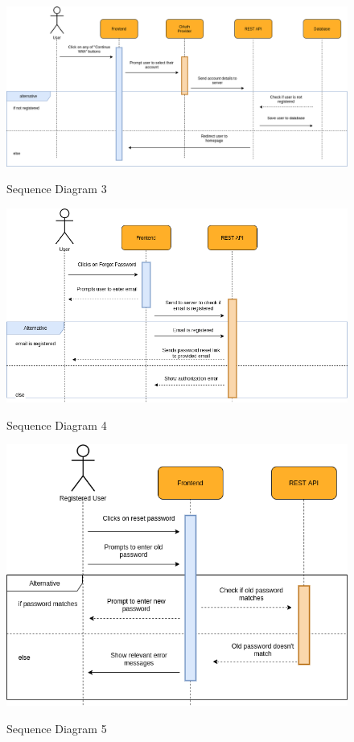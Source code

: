 \begin{figure}[H]
    \centering
    \caption{Sequence Diagram 3}
    \includegraphics[scale=0.5]{./diagrams/sequence/seq-03.png}
    \label{fig:seq-03}
    
\end{figure}


\begin{figure}[H]
    \centering
    \caption{Sequence Diagram 4}
    \includegraphics[scale=0.5]{./diagrams/sequence/seq-04.png}
    \label{fig:seq-04}
    
\end{figure}


\begin{figure}[H]
    \centering
    \caption{Sequence Diagram 5}
    \includegraphics[scale=0.5]{./diagrams/sequence/seq-05.png}
    \label{fig:seq-05}
    
\end{figure}


